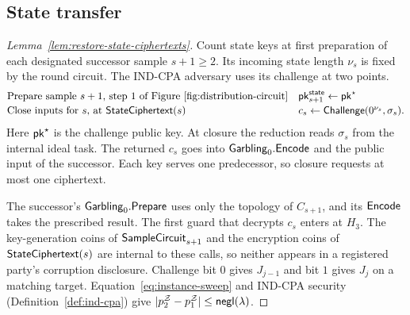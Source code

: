 \subsection{State transfer}
\label{sec:state-hybrid-proof}
\begin{proof}[Lemma~\ref{lem:restore-state-ciphertexts}]
Count state keys at first preparation of each designated successor sample
$s+1\geq2$.  Its incoming state length $\nu_s$ is fixed by the round
circuit.  The IND-CPA adversary uses its challenge at two points.
\[
 \begin{array}{@{}ll@{}}
  \text{Prepare sample }s+1\text{, step~1 of Figure~\ref{fig:distribution-circuit}}
    & \statepk_{s+1}\gets\pk^\star \\[2pt]
  \text{Close inputs for }s\text{, at }\StateCiphertext(s)
    & c_s\gets\Challenge(0^{\nu_s},\sigma_s).
 \end{array}
\]
Here $\mathsf{pk}^\star$ is the challenge public key.  At closure the reduction
reads $\sigma_s$ from the internal ideal task.  The returned $c_s$ goes into
$\mathsf{Garbling}_0.\mathsf{Encode}$ and the public input of the successor.  Each key
serves one predecessor, so closure requests at most one ciphertext.

The successor's $\mathsf{Garbling}_0.\mathsf{Prepare}$ uses only the topology of
$C_{s+1}$, and its $\mathsf{Encode}$ takes the prescribed result.
The first guard that decrypts $c_s$ enters at $H_3$.  The key-generation
coins of $\mathsf{SampleCircuit}_{s+1}$ and the encryption coins of
$\mathsf{StateCiphertext}(s)$ are internal to these calls, so neither appears in
a registered party's corruption disclosure.
Challenge bit $0$ gives $J_{j-1}$ and bit $1$ gives $J_j$ on a matching
target.  Equation~\eqref{eq:instance-sweep} and IND-CPA security
(Definition~\ref{def:ind-cpa}) give
$|p_2^{\mathcal Z}-p_1^{\mathcal Z}|\leq\mathop{\mathsf{negl}}(\lambda)$.
\end{proof}


